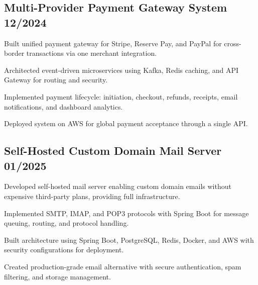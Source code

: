 \subsection{{Multi-Provider Payment Gateway System \hfill 12/2024}}
\begin{zitemize}
    \item Built unified payment gateway for Stripe, Reserve Pay, and PayPal for cross-border transactions via one merchant integration.
    \item Architected event-driven microservices using Kafka, Redis caching, and API Gateway for routing and security.
    \item Implemented payment lifecycle: initiation, checkout, refunds, receipts, email notifications, and dashboard analytics.
    \item Deployed system on AWS for global payment acceptance through a single API.
\end{zitemize}

\subsection{{Self-Hosted Custom Domain Mail Server \hfill 01/2025}}
\begin{zitemize}
    \item Developed self-hosted mail server enabling custom domain emails without expensive third-party plans, providing full infrastructure.
    \item Implemented SMTP, IMAP, and POP3 protocols with Spring Boot for message queuing, routing, and protocol handling.
    \item Built architecture using Spring Boot, PostgreSQL, Redis, Docker, and AWS with security configurations for deployment.
    \item Created production-grade email alternative with secure authentication, spam filtering, and storage management.
\end{zitemize}

